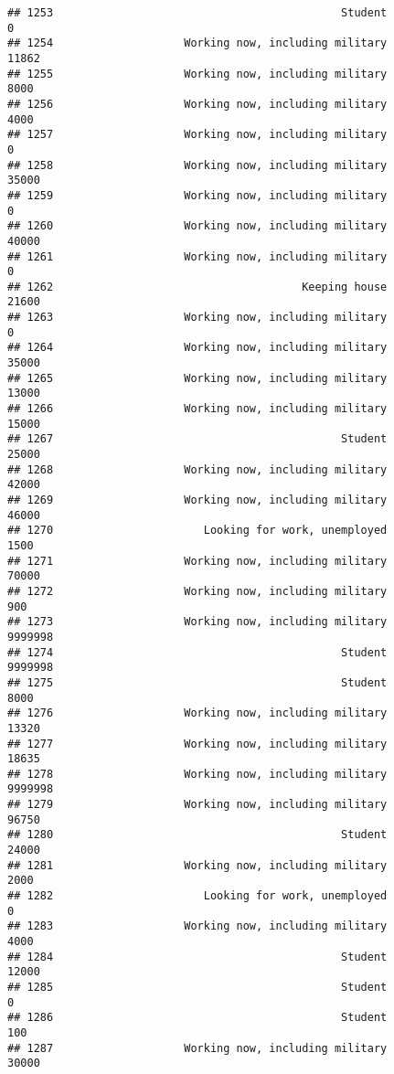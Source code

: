 \documentclass[]{book}
\theoremstyle{definition}
\theoremstyle{definition}
\theoremstyle{remark}
\begin{document}
\begin{verbatim}
## 1253                                            Student               0
## 1254                    Working now, including military           11862
## 1255                    Working now, including military            8000
## 1256                    Working now, including military            4000
## 1257                    Working now, including military               0
## 1258                    Working now, including military           35000
## 1259                    Working now, including military               0
## 1260                    Working now, including military           40000
## 1261                    Working now, including military               0
## 1262                                      Keeping house           21600
## 1263                    Working now, including military               0
## 1264                    Working now, including military           35000
## 1265                    Working now, including military           13000
## 1266                    Working now, including military           15000
## 1267                                            Student           25000
## 1268                    Working now, including military           42000
## 1269                    Working now, including military           46000
## 1270                       Looking for work, unemployed            1500
## 1271                    Working now, including military           70000
## 1272                    Working now, including military             900
## 1273                    Working now, including military         9999998
## 1274                                            Student         9999998
## 1275                                            Student            8000
## 1276                    Working now, including military           13320
## 1277                    Working now, including military           18635
## 1278                    Working now, including military         9999998
## 1279                    Working now, including military           96750
## 1280                                            Student           24000
## 1281                    Working now, including military            2000
## 1282                       Looking for work, unemployed               0
## 1283                    Working now, including military            4000
## 1284                                            Student           12000
## 1285                                            Student               0
## 1286                                            Student             100
## 1287                    Working now, including military           30000

\end{verbatim}
\end{document}
